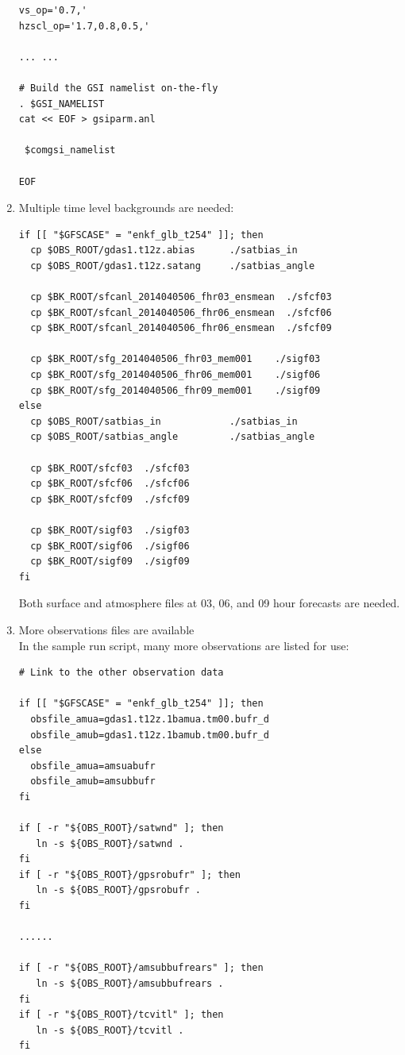 \begin{enumerate}
\begin{scriptsize}
\begin{verbatim}
vs_op='0.7,'
hzscl_op='1.7,0.8,0.5,'

... ...

# Build the GSI namelist on-the-fly
. $GSI_NAMELIST
cat << EOF > gsiparm.anl

 $comgsi_namelist

EOF
\end{verbatim}
\end{scriptsize}
\item Multiple time level backgrounds are needed:
\begin{scriptsize}
\begin{verbatim}
if [[ "$GFSCASE" = "enkf_glb_t254" ]]; then
  cp $OBS_ROOT/gdas1.t12z.abias      ./satbias_in
  cp $OBS_ROOT/gdas1.t12z.satang     ./satbias_angle

  cp $BK_ROOT/sfcanl_2014040506_fhr03_ensmean  ./sfcf03
  cp $BK_ROOT/sfcanl_2014040506_fhr06_ensmean  ./sfcf06
  cp $BK_ROOT/sfcanl_2014040506_fhr06_ensmean  ./sfcf09

  cp $BK_ROOT/sfg_2014040506_fhr03_mem001    ./sigf03
  cp $BK_ROOT/sfg_2014040506_fhr06_mem001    ./sigf06
  cp $BK_ROOT/sfg_2014040506_fhr09_mem001    ./sigf09
else
  cp $OBS_ROOT/satbias_in            ./satbias_in
  cp $OBS_ROOT/satbias_angle         ./satbias_angle

  cp $BK_ROOT/sfcf03  ./sfcf03
  cp $BK_ROOT/sfcf06  ./sfcf06
  cp $BK_ROOT/sfcf09  ./sfcf09

  cp $BK_ROOT/sigf03  ./sigf03
  cp $BK_ROOT/sigf06  ./sigf06
  cp $BK_ROOT/sigf09  ./sigf09
fi
\end{verbatim}
\end{scriptsize}
Both surface and atmosphere files at 03, 06, and 09 hour forecasts are needed. \\
\item More observations files are available\\
In the sample run script, many more observations are listed for use:
\begin{scriptsize}
\begin{verbatim}
# Link to the other observation data

if [[ "$GFSCASE" = "enkf_glb_t254" ]]; then
  obsfile_amua=gdas1.t12z.1bamua.tm00.bufr_d
  obsfile_amub=gdas1.t12z.1bamub.tm00.bufr_d
else
  obsfile_amua=amsuabufr
  obsfile_amub=amsubbufr
fi

if [ -r "${OBS_ROOT}/satwnd" ]; then
   ln -s ${OBS_ROOT}/satwnd .
fi
if [ -r "${OBS_ROOT}/gpsrobufr" ]; then
   ln -s ${OBS_ROOT}/gpsrobufr .
fi

......

if [ -r "${OBS_ROOT}/amsubbufrears" ]; then
   ln -s ${OBS_ROOT}/amsubbufrears .
fi
if [ -r "${OBS_ROOT}/tcvitl" ]; then
   ln -s ${OBS_ROOT}/tcvitl .
fi
\end{verbatim}
\end{scriptsize}
\end{enumerate}

